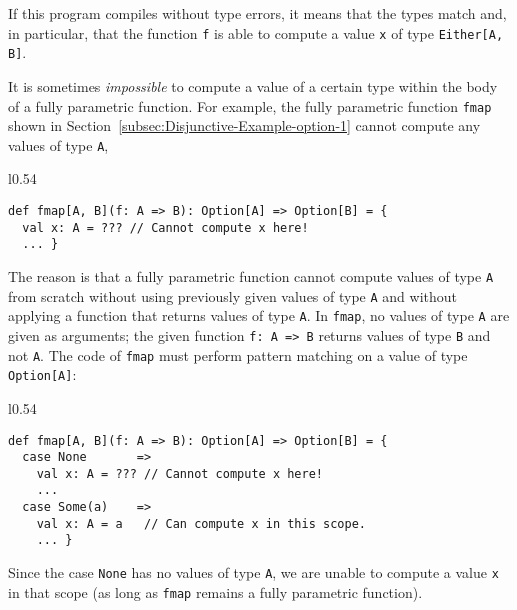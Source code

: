 \noindent If this program compiles without type errors, it means that
the types match and, in particular, that the function \lstinline!f!
is able to compute a value \lstinline!x! of type \lstinline!Either[A, B]!.

It is sometimes \emph{impossible} to compute a value of a certain
type within the body of a fully parametric function. For example,
the fully parametric function \lstinline!fmap! shown in Section~\ref{subsec:Disjunctive-Example-option-1}
cannot compute any values of type \lstinline!A!,

\begin{wrapfigure}{l}{0.54\columnwidth}%
\vspace{-0.65\baselineskip}
\begin{lstlisting}
def fmap[A, B](f: A => B): Option[A] => Option[B] = {
  val x: A = ??? // Cannot compute x here!
  ... }
\end{lstlisting}

\vspace{-0.9\baselineskip}
\end{wrapfigure}%

\noindent The reason is that a fully parametric function cannot compute
values of type \lstinline!A! from scratch without using previously
given values of type \lstinline!A! and without applying a function
that returns values of type \lstinline!A!. In \lstinline!fmap!,
no values of type \lstinline!A! are given as arguments; the given
function \lstinline!f: A => B! returns values of type \lstinline!B!
and not \lstinline!A!. The code of \lstinline!fmap! must perform
pattern matching on a value of type \lstinline!Option[A]!:

\begin{wrapfigure}{l}{0.54\columnwidth}%
\vspace{-0.65\baselineskip}
\begin{lstlisting}
def fmap[A, B](f: A => B): Option[A] => Option[B] = {
  case None       => 
    val x: A = ??? // Cannot compute x here!
    ...
  case Some(a)    =>
    val x: A = a   // Can compute x in this scope.
    ... }
\end{lstlisting}

\vspace{-0.9\baselineskip}
\end{wrapfigure}%

\noindent Since the case \lstinline!None! has no values of type \lstinline!A!,
we are unable to compute a value \lstinline!x! in that scope (as
long as \lstinline!fmap! remains a fully parametric function). 


